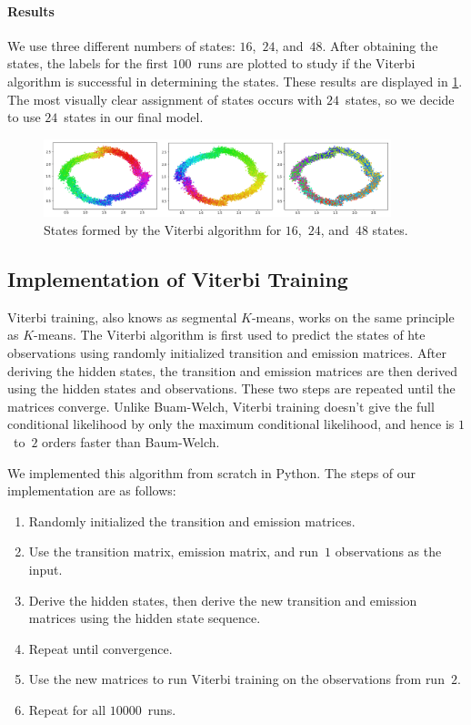 \documentclass[twoside]{article}
\begin{document}
\paragraph{Results}

We use three different numbers of states: $16$,~$24$, and~$48$.
After obtaining the states, the labels for the first $100$~runs are plotted to study if the Viterbi algorithm is successful in determining the states.
These results are displayed in \cref{fig:viterbi-states}.
The most visually clear assignment of states occurs with $24$~states, so we decide to use $24$~states in our final model.
\begin{figure}[h]
  \centering
  \includegraphics[width=0.9\textwidth]{images/viterbi-states}
  \caption{States formed by the Viterbi algorithm for $16$,~$24$, and~$48$ states.}\label{fig:viterbi-states}
\end{figure}

\subsection{Implementation of Viterbi Training}\label{sec:impl-viterbi-train}

Viterbi training, also knows as segmental $K$-means, works on the same principle as $K$-means.
The Viterbi algorithm is first used to predict the states of hte observations using randomly initialized transition and emission matrices.
After deriving the hidden states, the transition and emission matrices are then derived using the hidden states and observations.
These two steps are repeated until the matrices converge.
Unlike Buam-Welch, Viterbi training doesn't give the full conditional likelihood by only the maximum conditional likelihood, and hence is $1$~to~$2$ orders faster than Baum-Welch.

We implemented this algorithm from scratch in Python.
The steps of our implementation are as follows:
\begin{enumerate}
\item Randomly initialized the transition and emission matrices.
\item Use the transition matrix, emission matrix, and run~$1$ observations as the input.
\item Derive the hidden states, then derive the new transition and emission matrices using the hidden state sequence.
\item Repeat until convergence.
\item Use the new matrices to run Viterbi training on the observations from run~$2$.
\item Repeat for all $\num{10000}$~runs.
\end{enumerate}
\end{document}
